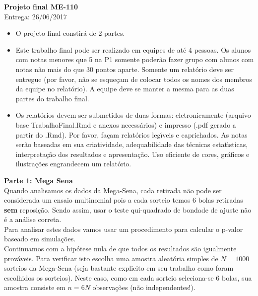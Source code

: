 \documentclass[12pt]{article}
\begin{document}
\begin{center}
{\bf Projeto final ME-110} \\
Entrega: 26/06/2017 \\
\end{center}
\vskip1cm

\begin{itemize}
\item O projeto final constir\'a de 2 partes. 

\item Este trabalho final pode ser realizado em equipes de at\'e 4 pessoas. Os alunos com notas menores que 5 na P1 somente poder\~ao fazer grupo com alunos com notas n\~ao mais do que 30 pontos aparte. Somente um relat\'{o}rio deve ser entregue (por favor, n\~{a}o se esque\c{c}am de colocar todos os nomes dos membros da equipe no relat\'{o}rio). A equipe deve se manter a mesma para as duas partes do trabalho final. 

\item Os relat\'{o}rios devem ser submetidos de duas formas: eletronicamente (arquivo base TrabalhoFinal.Rmd e anexos necess\'arios) e impresso (.pdf gerado a partir do .Rmd). Por favor,  fa\c{c}am relat\'{o}rios leg\'{\i}veis e caprichados. As notas ser\~{a}o baseadas em sua criatividade, adequabilidade das t\'{e}cnicas estat\'{\i}sticas, interpreta\c{c}\~{a}o dos resultados e apresenta\c{c}\~{a}o. Uso eficiente de cores, gr\'{a}ficos e ilustra\c{c}\~{o}es engrandecem um relat\'{o}rio.
\end{itemize}

\vskip1cm

{\large \bf Parte 1: Mega Sena} \\

Quando analisamos os dados da Mega-Sena, cada retirada n\~ao pode ser considerada um ensaio multinomial pois a cada sorteio temos 6 bolas
retiradas {\bf sem} reposi\c c\~ao. Sendo assim, usar o teste qui-quadrado de bondade de ajuste n\~ao \'e a an\'alise correta. \\

Para analisar estes dados vamos usar um procedimento para calcular o
p-valor baseado em simula\c c\~oes. \\

Continuamos com a hip\'otese nula de que todos os resultados s\~ao
igualmente prov\'aveis. Para verificar isto escolha uma amostra aleat\'oria simples de $N=1000$ sorteios da
Mega-Sena (seja bastante explicito em seu trabalho como  foram escolhidos os
sorteios). Neste caso, como em cada sorteio seleciona-se 6
bolas, sua amostra consiste em $n = 6 N$ observa\c c\~oes (n\~ao
independentes!). \\
\end{document}
